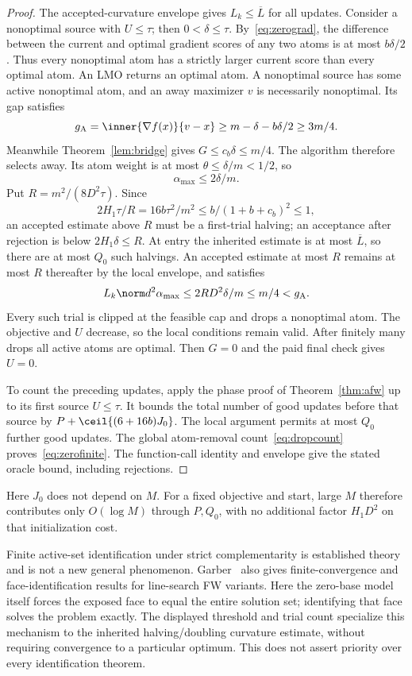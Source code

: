 \begin{proof}
The accepted-curvature envelope gives $L_k\le\overline L$ for all
updates. Consider a nonoptimal source with $U\le\tau$; then
$0<\delta\le\tau$. By~\eqref{eq:zerograd}, the difference between
the current and optimal gradient scores of any two atoms is at
most $b\delta/2$. Thus every nonoptimal atom has a strictly larger
current score than every optimal atom. An LMO returns an optimal
atom. A nonoptimal source has some active nonoptimal atom, and an
away maximizer $v$ is necessarily nonoptimal. Its gap satisfies
\[
 g_{\mathrm A}=\inner{\nabla f(x)}{v-x}
 \ge m-\delta-b\delta/2\ge3m/4.
\]
Meanwhile Theorem~\ref{lem:bridge} gives
$G\le c_b\delta\le m/4$. The algorithm therefore selects away.
Its atom weight is at most $\theta\le\delta/m<1/2$, so
\[
 \alpha_{\max}\le2\delta/m.
\]
Put $R=m^2/(8D^2\tau)$. Since
\[
 2H_1\tau/R=16b\tau^2/m^2
 \le b/(1+b+c_b)^2\le1,
\]
an accepted estimate above $R$ must be a first-trial halving;
an acceptance after rejection is below $2H_1\delta\le R$.
At entry the inherited estimate is at most $\overline L$, so there
are at most $Q_0$ such halvings. An accepted estimate at most $R$
remains at most $R$ thereafter by the local envelope, and satisfies
\[
 L_k\norm d^2\alpha_{\max}
 \le 2RD^2\delta/m\le m/4<g_{\mathrm A}.
\]
Every such trial is clipped at the feasible cap and drops a
nonoptimal atom. The objective and $U$ decrease, so the local
conditions remain valid. After finitely many drops all active atoms
are optimal. Then $G=0$ and the paid final check gives $U=0$.

To count the preceding updates, apply the phase proof of
Theorem~\ref{thm:afw} up to its first source $U\le\tau$.
It bounds the total number of good updates before that source
by $P+\ceil{(6+16b)J_0}$. The local argument permits at most
$Q_0$ further good updates. The global atom-removal count~\eqref{eq:dropcount}
proves~\eqref{eq:zerofinite}. The function-call identity and envelope
give the stated oracle bound, including rejections.
\end{proof}
Here $J_0$ does not depend on $M$. For a fixed objective and start,
large $M$ therefore contributes only $O(\log M)$ through $P,Q_0$,
with no additional factor $H_1D^2$ on that initialization cost.

Finite active-set identification under strict complementarity is
established theory~\cite[Theorem 3.1 and Appendix]{bomze}
and is not a new general phenomenon. Garber~\cite[Theorems 4--5]{garber}
also gives finite-convergence and face-identification results for
line-search FW variants. Here the zero-base model itself forces
the exposed face to equal the entire solution set; identifying
that face solves the problem exactly. The displayed threshold
and trial count specialize this mechanism to the inherited
halving/doubling curvature estimate, without requiring convergence
to a particular optimum. This does not assert priority over every
identification theorem.

